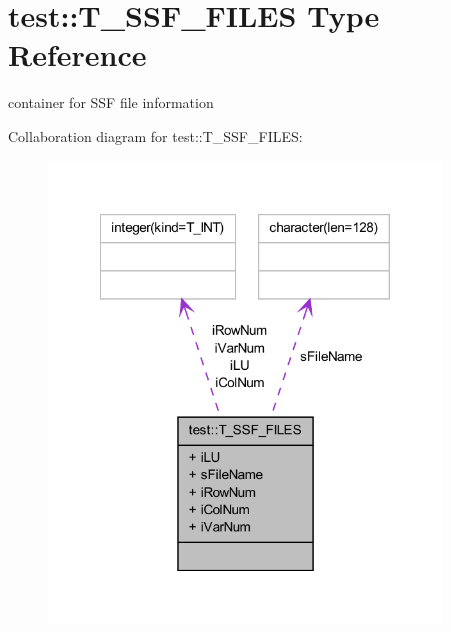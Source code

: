 \hypertarget{typetest_1_1_t___s_s_f___f_i_l_e_s}{
\section{test::T\_\-SSF\_\-FILES Type Reference}
\label{typetest_1_1_t___s_s_f___f_i_l_e_s}
}


container for SSF file information  




Collaboration diagram for test::T\_\-SSF\_\-FILES:\nopagebreak
\begin{figure}[H]
\begin{center}
\leavevmode
\includegraphics[width=296pt]{typetest_1_1_t___s_s_f___f_i_l_e_s__coll__graph}
\end{center}
\end{figure}
